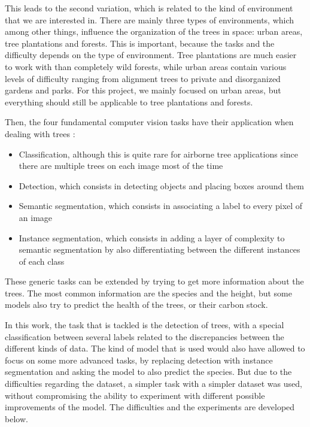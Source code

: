 \documentclass[
  letterpaper,
  DIV=11,
  numbers=noendperiod]{scrartcl}
\providecommand{\tightlist}{%
  \setlength{\itemsep}{0pt}\setlength{\parskip}{0pt}}\usepackage{longtable,booktabs,array}
\begin{document}
This leads to the second variation, which is related to the kind of
environment that we are interested in. There are mainly three types of
environments, which among other things, influence the organization of
the trees in space: urban areas, tree plantations and forests. This is
important, because the tasks and the difficulty depends on the type of
environment. Tree plantations are much easier to work with than
completely wild forests, while urban areas contain various levels of
difficulty ranging from alignment trees to private and disorganized
gardens and parks. For this project, we mainly focused on urban areas,
but everything should still be applicable to tree plantations and
forests.

Then, the four fundamental computer vision tasks have their application
when dealing with trees \autocite{olive-tree}:

\begin{itemize}
\tightlist
\item
  Classification, although this is quite rare for airborne tree
  applications since there are multiple trees on each image most of the
  time
\item
  Detection, which consists in detecting objects and placing boxes
  around them
\item
  Semantic segmentation, which consists in associating a label to every
  pixel of an image
\item
  Instance segmentation, which consists in adding a layer of complexity
  to semantic segmentation by also differentiating between the different
  instances of each class
\end{itemize}

These generic tasks can be extended by trying to get more information
about the trees. The most common information are the species and the
height, but some models also try to predict the health of the trees, or
their carbon stock.

In this work, the task that is tackled is the detection of trees, with a
special classification between several labels related to the
discrepancies between the different kinds of data. The kind of model
that is used would also have allowed to focus on some more advanced
tasks, by replacing detection with instance segmentation and asking the
model to also predict the species. But due to the difficulties regarding
the dataset, a simpler task with a simpler dataset was used, without
compromising the ability to experiment with different possible
improvements of the model. The difficulties and the experiments are
developed below.
\end{document}
